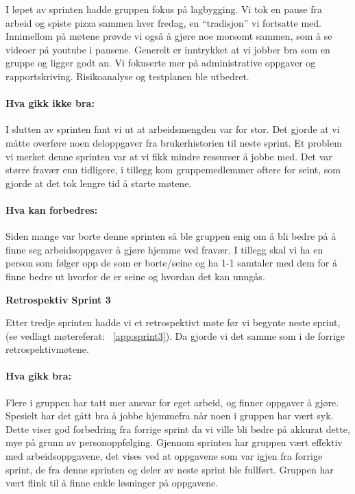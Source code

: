 \documentclass[12pt,a4paper,norsk]{article}
\begin{document}
I løpet av sprinten hadde gruppen fokus på lagbygging. Vi tok en pause fra arbeid og spiste pizza sammen hver fredag, en “tradisjon” vi fortsatte med. Innimellom på møtene prøvde vi også å gjøre noe morsomt sammen, som å se videoer på youtube i pausene.
Generelt er inntrykket at vi jobber bra som en gruppe og ligger godt an.
Vi fokuserte mer på administrative oppgaver og rapportskriving. Risikoanalyse og testplanen ble utbedret.

\paragraph{Hva gikk ikke bra:}
I slutten av sprinten fant vi ut at arbeidsmengden var for stor. Det gjorde at vi måtte overføre noen deloppgaver fra brukerhistorien til neste sprint.
Et problem vi merket denne sprinten var at vi fikk mindre ressurser å jobbe med. Det var større fravær enn tidligere, i tillegg kom gruppemedlemmer oftere for seint, som gjorde at det tok lengre tid å starte møtene.

\paragraph{Hva kan forbedres:}
Siden mange var borte denne sprinten så ble gruppen enig om å bli bedre på å finne seg arbeidsoppgaver å gjøre hjemme ved fravær.
I tillegg skal vi ha en person som følger opp de som er borte/seine og ha 1-1 samtaler med dem for å finne bedre ut hvorfor de er seine og hvordan det kan unngås.


\bigskip \noindent \textbf{Retrospektiv Sprint 3}
\par Etter tredje sprinten hadde vi et retrospektivt møte før vi begynte neste sprint, (se vedlagt møtereferat: ~\cref{app:sprint3}). Da gjorde vi det samme som i de forrige retrospektivmøtene.

\paragraph{Hva gikk bra:}
Flere i gruppen har tatt mer ansvar for eget arbeid, og finner oppgaver å gjøre. Spesielt har det gått bra å jobbe hjemmefra når noen i gruppen har vært syk. Dette viser god forbedring fra forrige sprint da vi ville bli bedre på akkurat dette, mye på grunn av personoppfølging.
Gjennom sprinten har gruppen vært effektiv med arbeidsoppgavene, det vises ved at oppgavene som var igjen fra forrige sprint, de fra denne sprinten og deler av neste sprint ble fullført. Gruppen har vært flink til å finne enkle løsninger på oppgavene.
\end{document}
